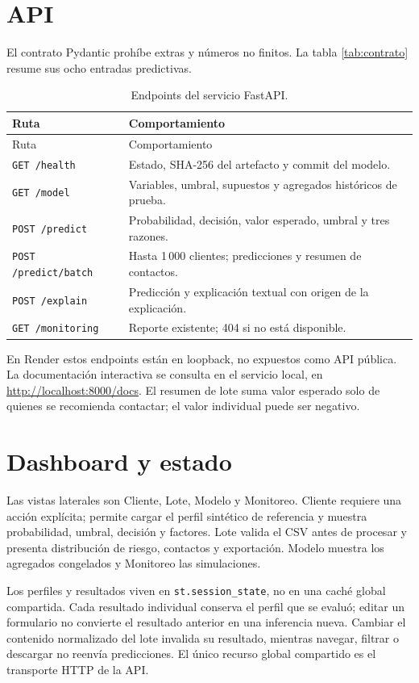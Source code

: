 \documentclass[11pt,a4paper,oneside]{report}
\begin{document}
\section{API}
El contrato Pydantic prohíbe extras y números no finitos. La tabla
\ref{tab:contrato} resume sus ocho entradas predictivas.
\begin{longtable}{@{}L{0.32\textwidth}L{0.58\textwidth}@{}}
\caption{Endpoints del servicio FastAPI.}\\
\toprule Ruta & Comportamiento \\\midrule\endfirsthead
\toprule Ruta & Comportamiento \\\midrule\endhead
\texttt{GET /health} & Estado, SHA-256 del artefacto y commit del modelo. \\
\texttt{GET /model} & Variables, umbral, supuestos y agregados históricos de prueba. \\
\texttt{POST /predict} & Probabilidad, decisión, valor esperado, umbral y tres razones. \\
\texttt{POST /predict/batch} & Hasta 1\,000 clientes; predicciones y resumen de contactos. \\
\texttt{POST /explain} & Predicción y explicación textual con origen de la explicación. \\
\texttt{GET /monitoring} & Reporte existente; 404 si no está disponible. \\
\bottomrule
\end{longtable}
En Render estos endpoints están en loopback, no expuestos como API pública.
La documentación interactiva se consulta en el servicio local, en
\url{http://localhost:8000/docs}. El resumen de lote suma valor esperado solo
de quienes se recomienda contactar; el valor individual puede ser negativo.

\section{Dashboard y estado}
Las vistas laterales son Cliente, Lote, Modelo y Monitoreo. Cliente requiere
una acción explícita; permite cargar el perfil sintético de referencia y
muestra probabilidad, umbral, decisión y factores. Lote valida el CSV antes
de procesar y presenta distribución de riesgo, contactos y exportación.
Modelo muestra los agregados congelados y Monitoreo las simulaciones.

Los perfiles y resultados viven en \texttt{st.session\_state}, no en una
caché global compartida. Cada resultado individual conserva el perfil que
se evaluó; editar un formulario no convierte el resultado anterior en una
inferencia nueva. Cambiar el contenido normalizado del lote invalida su
resultado, mientras navegar, filtrar o descargar no reenvía predicciones.
El único recurso global compartido es el transporte HTTP de la API.
\end{document}
